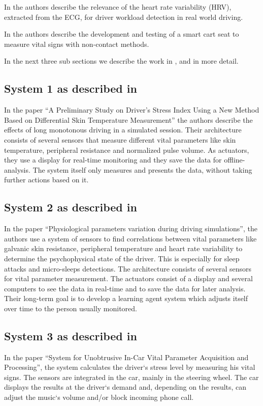 \documentclass[a4paper]{article}		%
\begin{document}
In \cite{eilebrecht:12} the authors describe the relevance of the heart rate variability (HRV), extracted from the ECG, for driver workload detection in real world driving.

In \cite{walter:11} the authors describe the development and testing of a smart cart seat to measure vital signs with non-contact methods.

In the next three sub sections we describe the work in \cite{yamakoshi:07}, \cite{Zocchi:07} and \cite{angelo:10} in more detail.
\subsection{System 1 as described in\cite{yamakoshi:07}}
\indent
\indent In the paper ``A Preliminary Study on Driver's Stress Index Using a New Method Based on Differential Skin Temperature Measurement'' the authors describe the effects of long monotonous driving in a simulated session. Their architecture consists of several sensors that measure different vital parameters like skin temperature, peripheral resistance and normalized pulse volume. As actuators, they use a display for real-time monitoring and they save the data for offline-analysis.
The system itself only measures and presents the data, without taking further actions based on it.
\subsection{System 2 as described in \cite{Zocchi:07}}
\indent
\indent In the paper ``Physiological parameters variation during driving simulations'', the authors use a system of sensors to find correlations between vital parameters like galvanic skin resistance, peripheral temperature and heart rate variability to determine the psychophysical state of the driver. This is especially for sleep attacks and micro-sleeps detections. The architecture consists of several sensors for vital parameter measurement. The actuators consist of a display and several computers to see the data in real-time and to save the data for later analysis. Their long-term goal is to develop a learning agent system which adjusts itself over time to the person usually monitored.
\subsection{System 3 as described in \cite{angelo:10}}
\indent
\indent In the paper ``System for Unobtrusive In-Car Vital Parameter Acquisition and Processing'', the system calculates the driver`s stress level by measuring his vital signs. The sensors are integrated in the car, mainly in the steering wheel. The car displays the results at the driver`s demand and, depending on the results, can adjust the music`s volume and/or block incoming phone call.
\end{document}
